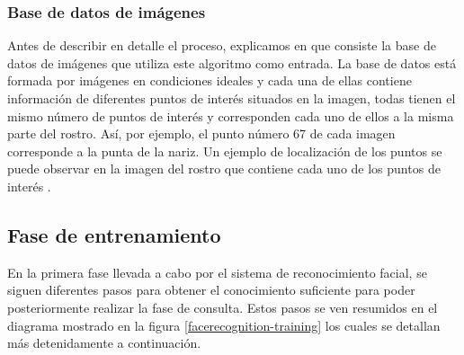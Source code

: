 \subsubsection{Base de datos de imágenes}

Antes de describir en detalle el proceso, explicamos en que consiste la base de datos de imágenes que utiliza este algoritmo como entrada. La base de datos est\'a formada por imágenes en condiciones ideales y cada una de ellas contiene información de diferentes puntos de interés situados en la imagen, todas tienen el mismo n\'umero de puntos de interés y corresponden cada uno de ellos a la misma parte del rostro. As\'i, por ejemplo, el punto n\'umero 67 de cada imagen corresponde a la punta de la nariz. Un ejemplo de localización de los puntos se puede observar en la imagen del rostro que contiene cada uno de los puntos de interés .

\subsection{Fase de entrenamiento}

En la primera fase llevada a cabo por el sistema de reconocimiento facial, se siguen diferentes pasos para obtener el conocimiento suficiente para poder posteriormente realizar la fase de consulta. Estos pasos se ven resumidos en el diagrama mostrado en la figura \ref{facerecognition-training} los cuales se detallan más detenidamente a continuación.



